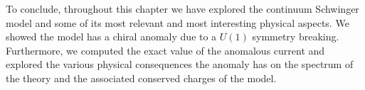  To conclude, throughout this chapter we have explored the continuum Schwinger model and some of its most relevant and most interesting physical aspects. We showed the model has a chiral anomaly due to a $U(1)$ symmetry breaking. Furthermore, we computed the exact value of the anomalous current and explored the various physical consequences the anomaly has on the spectrum of the theory and the associated conserved charges of the model.